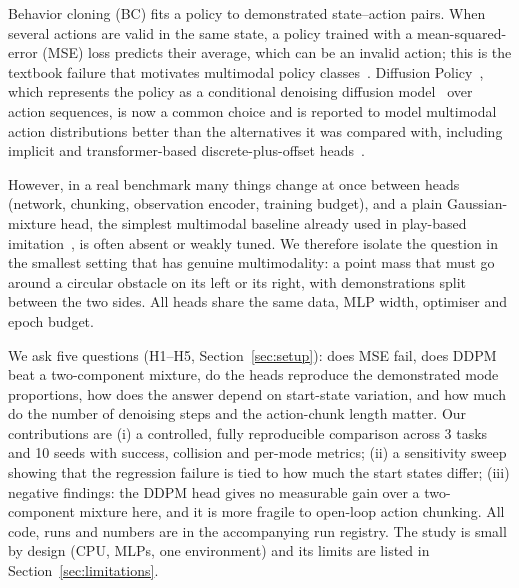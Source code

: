 Behavior cloning (BC) fits a policy to demonstrated state--action pairs. When several actions are valid in the same state, a policy trained with a mean-squared-error (MSE) loss predicts their average, which can be an invalid action; this is the textbook failure that motivates multimodal policy classes~\cite{florence2021implicit,shafiullah2022behavior,urain2024deep}. Diffusion Policy~\cite{chi2023diffusion}, which represents the policy as a conditional denoising diffusion model~\cite{ho2020denoising} over action sequences, is now a common choice and is reported to model multimodal action distributions better than the alternatives it was compared with, including implicit and transformer-based discrete-plus-offset heads~\cite{florence2021implicit,shafiullah2022behavior}.

However, in a real benchmark many things change at once between heads (network, chunking, observation encoder, training budget), and a plain Gaussian-mixture head, the simplest multimodal baseline already used in play-based imitation~\cite{lynch2019learning}, is often absent or weakly tuned. We therefore isolate the question in the smallest setting that has genuine multimodality: a point mass that must go around a circular obstacle on its left or its right, with demonstrations split between the two sides. All heads share the same data, MLP width, optimiser and epoch budget.

We ask five questions (H1--H5, Section~\ref{sec:setup}): does MSE fail, does DDPM beat a two-component mixture, do the heads reproduce the demonstrated mode proportions, how does the answer depend on start-state variation, and how much do the number of denoising steps and the action-chunk length matter. Our contributions are (i) a controlled, fully reproducible comparison across 3 tasks and 10 seeds with success, collision and per-mode metrics; (ii) a sensitivity sweep showing that the regression failure is tied to how much the start states differ; (iii) negative findings: the DDPM head gives no measurable gain over a two-component mixture here, and it is more fragile to open-loop action chunking. All code, runs and numbers are in the accompanying run registry. The study is small by design (CPU, MLPs, one environment) and its limits are listed in Section~\ref{sec:limitations}.
